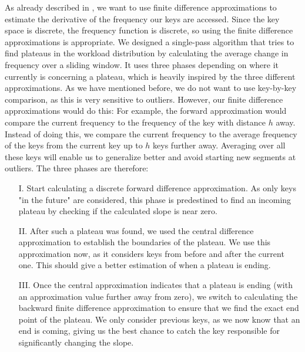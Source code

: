 As already described in , we want to use finite difference approximations to estimate the derivative of the frequency our keys are accessed. Since the key space is discrete, the frequency function is discrete, so using the finite difference approximations is appropriate. We designed a single-pass algorithm that tries to find plateaus in the workload distribution by calculating the average change in frequency over a sliding window. It uses three phases depending on where it currently is concerning a plateau, which is heavily inspired by the three different approximations. As we have mentioned before, we do not want to use key-by-key comparison, as this is very sensitive to outliers. However, our finite difference approximations would do this: For example, the forward approximation would compare the current frequency to the frequency of the key with distance $h$ away. Instead of doing this, we compare the current frequency to the average frequency of the keys from the current key up to $h$ keys further away. Averaging over all these keys will enable us to generalize better and avoid starting new segments at outliers. The three phases are therefore:

\begin{enumerate}
    \item[I.] Start calculating a discrete forward difference approximation. As only keys "in the future" are considered, this phase is predestined to find an incoming plateau by checking if the calculated slope is near zero.
    \item[II.] After such a plateau was found, we used the central difference approximation to establish the boundaries of the plateau. We use this approximation now, as it considers keys from before and after the current one. This should give a better estimation of when a plateau is ending.
    \item[III.] Once the central approximation indicates that a plateau is ending (with an approximation value further away from zero), we switch to calculating the backward finite difference approximation to ensure that we find the exact end point of the plateau. We only consider previous keys, as we now know that an end is coming, giving us the best chance to catch the key responsible for significantly changing the slope.
\end{enumerate}


